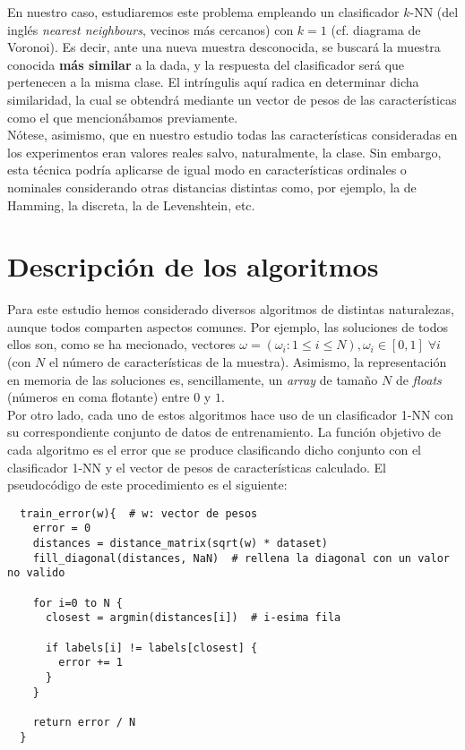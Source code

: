 \documentclass[11pt]{article}
\theoremstyle{plain}
\theoremstyle{definition}
\begin{document}
En nuestro caso, estudiaremos este problema empleando un clasificador
$k$-NN (del inglés \textit{nearest neighbours}, vecinos más cercanos)
con $k = 1$ (cf. diagrama de Voronoi). Es decir, ante una nueva muestra desconocida, se buscará
la muestra conocida \textbf{más similar} a la dada, y la respuesta del
clasificador será que pertenecen a la misma clase. El intríngulis aquí
radica en determinar dicha similaridad, la cual se obtendrá mediante
un vector de pesos de las características como el que mencionábamos previamente. \\

Nótese, asimismo, que en nuestro estudio todas las características
consideradas en los experimentos eran valores reales salvo,
naturalmente, la clase. Sin embargo, esta técnica podría aplicarse de
igual modo en características ordinales o nominales considerando otras distancias
distintas como, por ejemplo, la de Hamming, la discreta, la de
Levenshtein, etc. \\

\section{Descripción de los algoritmos}

Para este estudio hemos considerado diversos algoritmos de distintas
naturalezas, aunque todos comparten aspectos comunes. Por ejemplo, las
soluciones de todos ellos son, como se ha mecionado, vectores $\omega
= (\omega_i : 1 \le i \le N), \omega_i \in [0, 1] \; \forall i$ (con
$N$ el número de características de la muestra). Asimismo, la
representación en memoria de las soluciones es, sencillamente, un
\textit{array} de tamaño $N$ de \textit{floats} (números en coma flotante) entre $0$
y $1$. \\

Por otro lado, cada uno de estos algoritmos hace uso de un
clasificador 1-NN con su correspondiente conjunto de datos de
entrenamiento. La función objetivo de cada algoritmo es el error que
se produce clasificando dicho conjunto con el clasificador 1-NN y el
vector de pesos de características calculado. El pseudocódigo de este
procedimiento es el siguiente: \\

\begin{lstlisting}
  train_error(w){  # w: vector de pesos
    error = 0
    distances = distance_matrix(sqrt(w) * dataset)
    fill_diagonal(distances, NaN)  # rellena la diagonal con un valor no valido

    for i=0 to N {
      closest = argmin(distances[i])  # i-esima fila

      if labels[i] != labels[closest] {
        error += 1
      }
    }

    return error / N
  }
\end{lstlisting}
\end{document}
